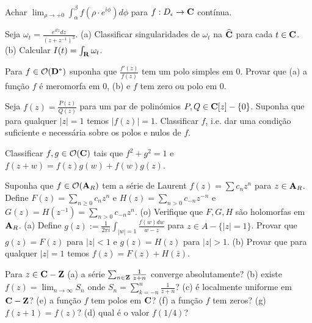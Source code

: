 \begin{prob}\label{p5} %
Achar $\lim_{\rho\to+0} \int_\alpha^\beta f(\rho\cdot e^{i\phi}) d\phi$
para $f : D_\epsilon\to\mathbf{C}$ contínua.
\end{prob}

\begin{prob}\label{p6} %
Seja $\omega_t = \frac{e^{itz} dz}{(z+z^{-1})^3}$.
(a) Classificar singularidades de $\omega_t$ na $\widehat{\mathbf{C}}$
para cada $t\in\mathbf{C}$.
(b) Calcular $I(t) = \int_{\mathbf{R}} \omega_t$.
\end{prob}

\begin{prob}\label{p7} %
Para $f\in\mathcal{O}(\mathbf{D}^*)$ %
suponha que $\frac{f'(z)}{f(z)}$
tem um polo simples em $0$. Provar que
(a) a função $f$ é meromorfa em $0$,
(b) e $f$ tem zero ou polo em $0$.
\end{prob}

\begin{prob}\label{p8} %
Seja $f(z) = \frac{P(z)}{Q(z)}$ para um par de polinómios $P,Q\in\mathbf{C}[z]-\{0\}$.
Suponha que para qualquer $|z|=1$ temos $|f(z)|=1$. Classificar $f$,
i.e. dar uma condição suficiente e necessária sobre os polos e nulos de $f$.
\end{prob}

\begin{prob}\label{p9} %
Classificar $f,g\in\mathcal{O}(\mathbf{C})$ tais que
$f^2+g^2=1$ e $f(z+w) = f(z) g(w) + f(w) g(z)$.
\end{prob}

\begin{prob}\label{p10} %
Suponha que $f \in \mathcal{O}(\mathbf{A}_R)$ %
tem a série de Laurent $f(z) = \sum c_n z^n$ para $z\in \mathbf{A}_R$.
Define $F(z) = \sum_{n\geq 0} c_n z^n$ e $H(z) = \sum_{n>0} c_{-n} z^{-n}$ e $G(z) = H(z^{-1}) = \sum_{n>0} c_{-n} z^{n}$.
(o) Verifique que $F,G,H$ são holomorfas em $\mathbf{A}_R$.
(a) Define $g(z) := \frac{1}{2\pi i} \int_{|w|=1} \frac{f(w) dw}{w-z}$
para $z\in A - \{|z|=1\}$. Provar que $g(z) = F(z)$ para $|z|<1$ e $g(z)=H(z)$ para $|z|>1$.
(b) Provar que para qualquer $|z|=1$ temos $f(z) = F(z) + H(\bar{z})$.
\end{prob}

\begin{prob}\label{p11} %
Para $z\in\mathbf{C}-\mathbf{Z}$
(a) a série $\sum_{n\in\mathbf{Z}} \frac{1}{z+n}$ converge absolutamente?
(b) existe $f(z) = \lim_{n\to\infty} S_n$ onde $S_n = \sum_{k=-n}^n \frac{1}{z+n}$?
(c) é localmente uniforme em $\mathbf{C}-\mathbf{Z}$?
(e) a função $f$ tem polos em $\mathbf{C}$?
(f) a função $f$ tem zeros?
(g) $f(z+1) = f(z)$?
(d) qual é o valor $f(1/4)$?
\end{prob}

